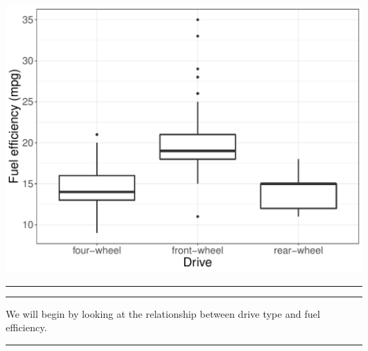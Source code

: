 \documentclass[11pt]{article}
\begin{document}
\begin{center}
\includegraphics[scale=0.7]{exam2_fig1.pdf}
\end{center}

\rule{\textwidth}{1pt}

\pagebreak

\rule{\textwidth}{1pt}

We will begin by looking at the relationship between drive type and fuel efficiency.

\rule{\textwidth}{1pt}
\end{document}
